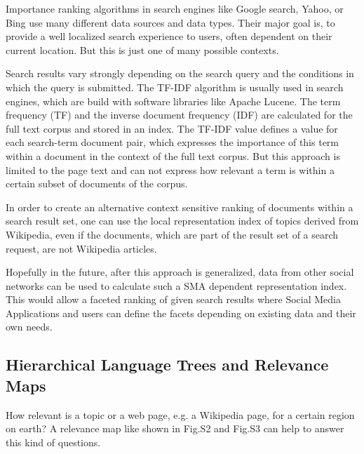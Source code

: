 \documentclass[a4paper,10pt]{scrbook}
\begin{document}
Importance ranking algorithms in search engines like Google search, Yahoo, or
Bing use many different data sources and data types. Their major goal is, to
provide a well localized search experience to users, often dependent on their
current location. But this is just one of many possible contexts.

Search results vary strongly depending on the search
query and the conditions in which the query is submitted. The TF-IDF algorithm
is usually used in search engines, which are build with software libraries like 
Apache Lucene. The term frequency (TF) and the inverse document frequency (IDF)
are calculated for the full text corpus and stored in an index. The TF-IDF value
defines a value for each search-term document pair, which expresses
the importance of this term within a document in the context of the full
text corpus. But this approach is limited
to the page text and can not express how relevant a term is within a certain
subset of documents of the corpus.

In order to create an alternative context sensitive ranking of documents within
a
search result set, one can use the local representation index of topics derived
from Wikipedia, even if the
documents, which are part of the result set of a search request, are not
Wikipedia articles.

Hopefully in the future, after this approach is generalized, data from other
social networks can be used to calculate such a SMA dependent representation
index. This would allow a faceted ranking of given search results where Social
Media Applications and users can define the facets depending on existing data
and their own needs.

\subsection{Hierarchical Language Trees and Relevance Maps}

\cite{Chen2010}


How relevant is a topic or a web page, e.g. a Wikipedia page, for a certain
region on earth? A relevance map like shown in Fig.S2 and Fig.S3
can help to answer this kind of questions.
\end{document}
